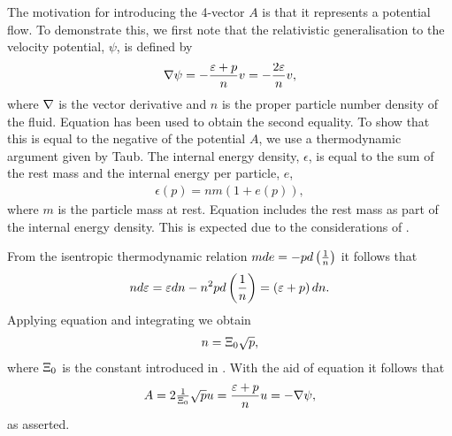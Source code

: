 The motivation for introducing the 4-vector $A$ is that it represents a potential flow.
To demonstrate this, we first note that the relativistic generalisation to the velocity potential, $\psi$,  is defined\cite{LandauBook} by
\begin{align}
 \nabla \psi = - \frac{\varepsilon+p}{n} v = - \frac{2\varepsilon}{n} v,
\label{eqn:relPot}
\end{align}
where $\nabla$ is the vector derivative and  $n$ is the proper particle number density of the fluid.
Equation  has been used to obtain the second equality.
To show that this is equal to the negative of the potential $A$, we use a thermodynamic argument given by Taub\cite{Taub1978}.
The internal energy density, $\epsilon$, is equal to the sum of the rest mass and the internal energy per particle\cite{LandauBook, Taub1978}, $e$, 
\begin{align}
  \epsilon(p) = nm( 1 + e(p)),
\label{eqn:relEpsilon}
\end{align}
where $m$ is the particle mass at rest.
Equation  includes the rest mass as part of the internal energy density.  
This is expected due to the considerations of .

From the isentropic thermodynamic relation $m de = - p d\left( \frac{1}{n} \right)$
it follows that 
\begin{align}
 n d\varepsilon = \varepsilon dn - n^2 p d \left( \frac{1}{n} \right) = \left( \varepsilon + p \right) dn.
\label{eqn:relNEpsilon}
\end{align}
Applying equation  and integrating we obtain
\begin{align}
n =\Xi_0 \sqrt{   p },
\label{eqn:relN}
\end{align}
where $\Xi_0$ is the constant introduced in .
With the aid of equation  it follows that
\begin{align}
A = 2\tfrac{1}{\Xi_0}\sqrt p  u =\frac{\varepsilon + p}{n} u =  -\nabla \psi,
\label{eqn:AisPotFlow}
\end{align}
as asserted.




